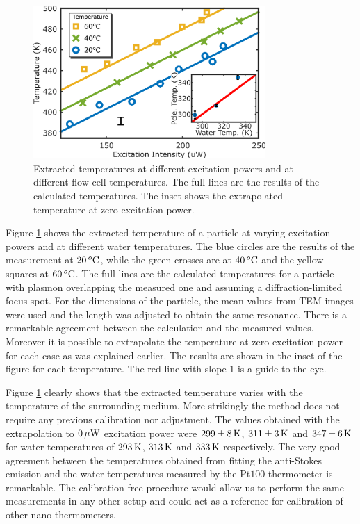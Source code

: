 \begin{figure}[tp] \centering
\includegraphics[width=88.4mm]{Chapters/04_Anti-Stokes/Figures/03_Fit_Of_AS/03_Log_Fit_AS_02.png}
\caption{Extracted temperatures at different excitation powers and at
different flow cell temperatures. The full lines are the results of the
calculated temperatures. The inset shows the extrapolated temperature at zero
excitation power.}
	\label{fig:AS_temp}
\end{figure}

Figure \ref{fig:AS_temp} shows the extracted temperature of a particle at
varying excitation powers and at different water temperatures. The blue circles
are the results of the measurement at $20\,^o\textrm{C}$, while the green crosses are
at $40\,^o\textrm{C}$ and the yellow squares at $60\,^o\textrm{C}$. The full lines are the
calculated temperatures for a particle with plasmon overlapping the measured one
and assuming a diffraction-limited focus spot. For the dimensions of the
particle, the mean values from TEM images were used and the length was adjusted
to obtain the same resonance. There is a remarkable agreement between the
calculation and the measured values. Moreover it is possible to extrapolate the
temperature at zero excitation power for each case as was explained earlier. The
results are shown in the inset of the figure for each temperature. The red line
with slope $1$ is a guide to the eye.

Figure \ref{fig:AS_temp} clearly shows that the extracted temperature varies
with the temperature of the surrounding medium. More strikingly the method does
not require any previous calibration nor adjustment. The values obtained with
the extrapolation to $0\,\mu\textrm{W}$ excitation power were $299 \pm 8\,\textrm{K}$, $311\pm 3\,\textrm{K}$
and $347 \pm 6\,\textrm{K}$ for water temperatures of $293\,\textrm{K}$, $313\,\textrm{K}$ and $333\,\textrm{K}$
respectively. The very good agreement between the temperatures
obtained from fitting the anti-Stokes emission and the water temperatures
measured by the Pt$100$ thermometer is remarkable. The calibration-free
procedure would allow us to perform the same measurements in any other setup and
could act as a reference for calibration of other nano thermometers.

